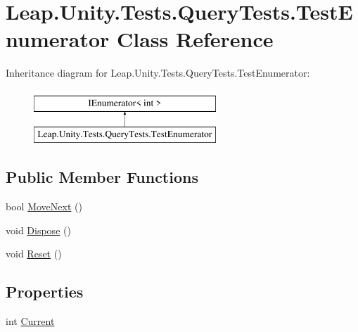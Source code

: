 \hypertarget{class_leap_1_1_unity_1_1_tests_1_1_query_tests_1_1_test_enumerator}{}\section{Leap.\+Unity.\+Tests.\+Query\+Tests.\+Test\+Enumerator Class Reference}
\label{class_leap_1_1_unity_1_1_tests_1_1_query_tests_1_1_test_enumerator}
Inheritance diagram for Leap.\+Unity.\+Tests.\+Query\+Tests.\+Test\+Enumerator\+:\begin{figure}[H]
\begin{center}
\leavevmode
\includegraphics[height=2.000000cm]{class_leap_1_1_unity_1_1_tests_1_1_query_tests_1_1_test_enumerator}
\end{center}
\end{figure}
\subsection*{Public Member Functions}
\begin{DoxyCompactItemize}
\item 
bool \mbox{\hyperlink{class_leap_1_1_unity_1_1_tests_1_1_query_tests_1_1_test_enumerator_aeb5e63de66e4a20bc5dc3fae66458096}{Move\+Next}} ()
\item 
void \mbox{\hyperlink{class_leap_1_1_unity_1_1_tests_1_1_query_tests_1_1_test_enumerator_a9e00375db31ee7eb1ab65b72a9b84f5a}{Dispose}} ()
\item 
void \mbox{\hyperlink{class_leap_1_1_unity_1_1_tests_1_1_query_tests_1_1_test_enumerator_ac9dc19068f6d4f49439216f4cdbe7834}{Reset}} ()
\end{DoxyCompactItemize}
\subsection*{Properties}
\begin{DoxyCompactItemize}
\item 
int \mbox{\hyperlink{class_leap_1_1_unity_1_1_tests_1_1_query_tests_1_1_test_enumerator_a34d69ed8f0700eaa4fed75af9f45f331}{Current}}
\end{DoxyCompactItemize}


